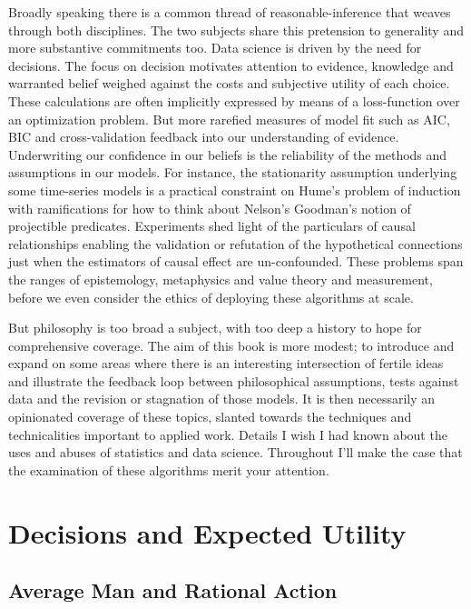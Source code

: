\documentclass[]{tufte-book}
\theoremstyle{definition}
\theoremstyle{definition}
\theoremstyle{definition}
\theoremstyle{remark}
\begin{document}
Broadly speaking there is a common thread of reasonable-inference that weaves through both disciplines. The two subjects share this pretension to generality and more substantive commitments too. Data science is driven by the need for decisions. The focus on decision motivates attention to evidence, knowledge and warranted belief weighed against the costs and subjective utility of each choice. These calculations are often implicitly expressed by means of a loss-function over an optimization problem. But more rarefied measures of model fit such as AIC, BIC and cross-validation feedback into our understanding of evidence. Underwriting our confidence in our beliefs is the reliability of the methods and assumptions in our models. For instance, the stationarity assumption underlying some time-series models is a practical constraint on Hume's problem of induction with ramifications for how to think about Nelson's Goodman's notion of projectible predicates. Experiments shed light of the particulars of causal relationships enabling the validation or refutation of the hypothetical connections just when the estimators of causal effect are un-confounded. These problems span the ranges of epistemology, metaphysics and value theory and measurement, before we even consider the ethics of deploying these algorithms at scale.

But philosophy is too broad a subject, with too deep a history to hope for comprehensive coverage. The aim of this book is more modest; to introduce and expand on some areas where there is an interesting intersection of fertile ideas and illustrate the feedback loop between philosophical assumptions, tests against data and the revision or stagnation of those models. It is then necessarily an opinionated coverage of these topics, slanted towards the techniques and technicalities important to applied work. Details I wish I had known about the uses and abuses of statistics and data science. Throughout I'll make the case that the examination of these algorithms merit your attention.

\hypertarget{decisions-and-expected-utility}{%
\chapter{Decisions and Expected Utility}\label{decisions-and-expected-utility}}

\hypertarget{average-man-and-rational-action}{%
\section{Average Man and Rational Action}\label{average-man-and-rational-action}}
\end{document}
